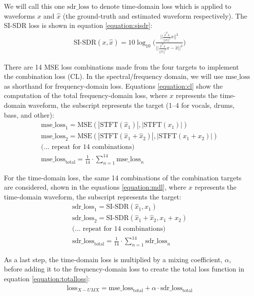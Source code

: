 \documentclass[report.tex]{subfiles}
\begin{document}
We will call this one $\text{sdr\_loss}$ to denote time-domain loss which is applied to waveforms $x$ and $\hat{x}$ (the ground-truth and estimated waveform respectively). The SI-SDR loss is shown in equation \eqref{equation:sisdr}:
\begin{align}
	& \text{SI-SDR}(x, \hat{x}) = 10 \log_{10}\Big(\frac{||\frac{\hat{x}^{T}x}{||x||^{2}} x||^{2}}{||\frac{\hat{x}^{T}x}{||x||^{2}} x - \hat{x}||^{2}}\Big)\tag{33}\label{equation:sisdr}
\end{align}

There are 14 MSE loss combinations made from the four targets to implement the combination loss (CL). In the spectral/frequency domain, we will use $\text{mse\_loss}$ as shorthand for frequency-domain loss. Equations \eqref{equation:cl} show the computation of the total frequency-domain loss, where $x$ represents the time-domain waveform, the subscript represents the target (1--4 for vocals, drums, bass, and other):
\begin{align}\tag{34}\label{equation:cl}
	\nonumber & \text{mse\_loss}_{1} = \text{MSE}(|\text{STFT}(\hat{x}_{1})|, |\text{STFT}(x_{1})|)\\
	\nonumber & \text{mse\_loss}_{2} = \text{MSE}(|\text{STFT}(\hat{x}_{1} + \hat{x}_{2})|, |\text{STFT}(x_{1} + x_{2})|)\\
	\nonumber & \text{(... repeat for 14 combinations)}\\
	\nonumber & \text{mse\_loss}_{\text{total}} = \frac{1}{14} \cdot \sum_{n = 1}^{14}{\text{mse\_loss}_{n}}
\end{align}

For the time-domain loss, the same 14 combinations of the combination targets are considered, shown in the equations \eqref{equation:mdl}, where $x$ represents the time-domain waveform, the subscript represents the target:
\begin{align}\tag{35}\label{equation:mdl}
	\nonumber & \text{sdr\_loss}_{1} = \text{SI-SDR}(\hat{x}_{1}, x_{1})\\
	\nonumber & \text{sdr\_loss}_{2} = \text{SI-SDR}(\hat{x}_{1} + \hat{x}_{2}, x_{1} + x_{2})\\
	\nonumber & \text{(... repeat for 14 combinations)}\\
	\nonumber & \text{sdr\_loss}_{\text{total}} = \frac{1}{14} \cdot \sum_{n = 1}^{14}{\text{sdr\_loss}_{n}}
\end{align}

As a last step, the time-domain loss is multiplied by a mixing coefficient, $\alpha$, before adding it to the frequency-domain loss to create the total loss function in equation \eqref{equation:totalloss}:
\begin{align}\tag{36}\label{equation:totalloss}
	\nonumber & \text{loss}_{X-UMX} = \text{mse\_loss}_{\text{total}} + \alpha \cdot \text{sdr\_loss}_{\text{total}}
\end{align}
\end{document}
